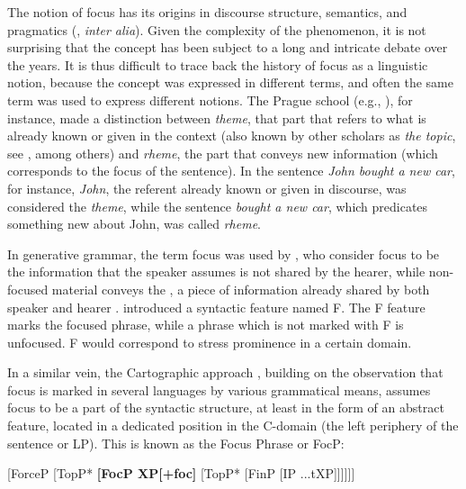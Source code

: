 The notion of focus has its origins in discourse structure, semantics, and pragmatics  (\cite{krifka2008basic, rooth1985association, rooth1992theory, schwarzschild1999givenness, von1990current}, \textit{inter alia}). Given the complexity of the phenomenon, it is not surprising that the concept has been subject to a long and intricate debate over the years. 
It is thus difficult to trace back the history of focus as a linguistic notion, because the concept was expressed in different terms, and often the same term was used to express different notions. The Prague school (e.g., \cite{mathesius1983functional, danevs1964three, firbas1971concept}), for instance, made a distinction between \textit{theme}, that part that refers to what is already known or given in the context (also known by other scholars as \textit{the topic}, see \cite{reinhart1981pragmatics, jacobs2001dimensions}, among others) and \textit{rheme}, the part that conveys new information (which corresponds to the focus of the sentence). In the sentence \textit{John bought a new car}, for instance, \textit{John}, the referent already known or given in discourse, was considered the \textit{theme}, while the sentence \textit{bought a new car}, which predicates something new about John, was called \textit{rheme}.

In generative grammar, the term focus was used by \textcite{chomsky1970some, jackendoff1972semantic,brody1990some, rizzi1997fine}, who consider focus to be the information that the speaker assumes is not shared by the hearer, while non-focused material conveys the , a piece of information already shared by both speaker and hearer \parencite[2122]{frascarelli2010narrow}.  \textcite{jackendoff1972semantic} introduced a syntactic feature named F. The F feature marks the focused phrase, while a phrase which is not marked with F is unfocused. F would correspond to stress prominence in a certain domain. 
 
In a similar vein, the Cartographic approach \parencite{rizzi1997fine}, building on the observation that focus is marked in several languages by various grammatical means, assumes focus to be a part of the syntactic structure, at least in the form of an abstract feature, located in a dedicated position in the C-domain (the left periphery of the sentence or LP). This is known as the Focus Phrase or FocP:

\ea
 
{} [ForceP [TopP* \textbf{[FocP XP[+foc]} [TopP* [FinP [IP ...tXP]]]]]]\ \\
\z


